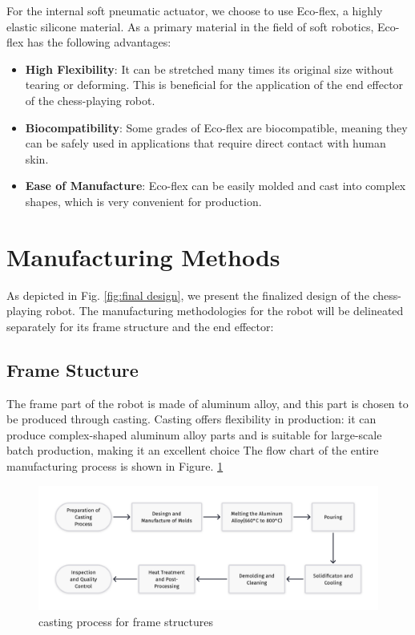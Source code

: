 \documentclass[10pt, a4paper, twocolumn]{article}
\begin{document}
For the internal soft pneumatic actuator, we choose to use Eco-flex, a highly elastic silicone material. As a primary material in the field of soft robotics, Eco-flex has the following advantages:
\begin{itemize}
    \item \textbf{High Flexibility}: It can be stretched many times its original size without tearing or deforming. This is beneficial for the application of the end effector of the chess-playing robot.
    \item \textbf{Biocompatibility}: Some grades of Eco-flex are biocompatible, meaning they can be safely used in applications that require direct contact with human skin.
    \item \textbf{Ease of Manufacture}: Eco-flex can be easily molded and cast into complex shapes, which is very convenient for production. 
\end{itemize}

\section{Manufacturing Methods}

As depicted in Fig. \ref{fig:final design}, we present the finalized design of the chess-playing robot. The manufacturing methodologies for the robot will be delineated separately for its frame structure and the end effector:

\subsection{Frame Stucture}
The frame part of the robot is made of aluminum alloy, and this part is chosen to be produced through casting. Casting offers flexibility in production: it can produce complex-shaped aluminum alloy parts and is suitable for large-scale batch production, making it an excellent choice
The flow chart of the entire manufacturing process is shown in Figure. \ref{fig:Casting process for frame structures}

\begin{figure}
        \centering
        \includegraphics[width=1\linewidth]{casting.png}
        \caption{casting process for frame structures}
        \label{fig:Casting process for frame structures}
\end{figure}
\end{document}
